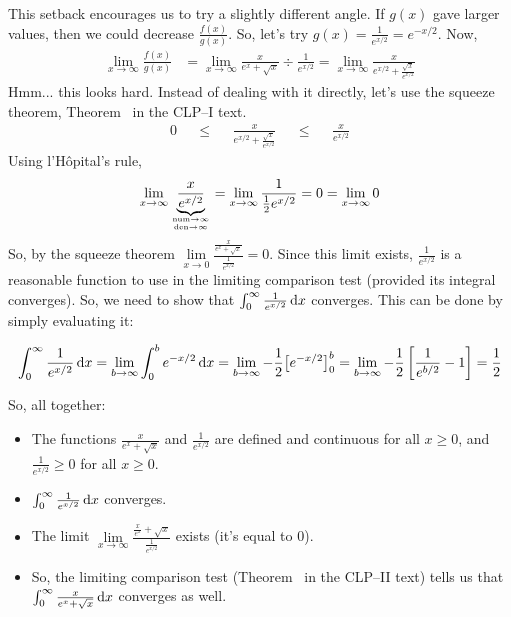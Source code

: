 \begin{solution}
\begin{description}
This setback encourages us to try a slightly different angle. If $g(x)$ gave larger values, then we could decrease $\frac{f(x)}{g(x)}$. So, let's try $g(x) = \frac{1}{e^{x/2}} = e^{-x/2}$. Now,
\begin{align*}
\lim_{x \to \infty}\frac{f(x)}{g(x)} &=
\lim_{x \to \infty}\frac{x}{e^x+\sqrt{x}}\div \frac{1}{e^{x/2}}=
\lim_{x \to \infty}\frac{x}{e^{x/2}+\frac{\sqrt{x}}{e^{x/2}}}
\end{align*}
Hmm... this looks hard. Instead of dealing with it directly, let's use the squeeze theorem, Theorem~ in the CLP--I text.
\begin{align*}
0 &&\leq&& \frac{x}{e^{x/2}+\frac{\sqrt{x}}{e^{x/2 }}}&&\leq&& \frac{x}{e^{x/2}}
\end{align*}
Using l'H\^{o}pital's rule,
\[\lim_{x \to \infty} \underbrace{\frac{x}{e^{x/2}}}_{\atp{\mathrm{num}\to \infty}{\mathrm{den}\to\infty}} = \lim_{x \to \infty}\frac{1}{\frac{1}{2}e^{x/2}}=0 = \lim_{x \to \infty}0\]
So, by the squeeze theorem $\lim\limits_{x \to 0}\frac{\frac{x}{e^x+\sqrt{x}}}{\frac{1}{e^{x/2}}}=0$. Since this limit exists, $\frac{1}{e^{x/2}}$ is a reasonable function to use in the limiting comparison test (provided its integral converges). So, we need to show that $\int_0^\infty \frac{1}{e^{x/2}}\,\mathrm{d}x$ converges. This can be done by simply evaluating it:

\[\int_0^\infty \frac{1}{e^{x/2}}\,\mathrm{d}x = \lim_{b \to \infty}\int_0^b {e^{-x/2}}\,\mathrm{d}x
= \lim_{b \to \infty} -\frac{1}{2}\big[e^{-x/2}\big]_0^b
= \lim_{b \to \infty} -\frac{1}{2}\left[\frac{1}{e^{b/2}}-1\right] = \frac{1}{2}\]

So, all together:

\begin{itemize}
\item The functions $\frac{x}{e^x+\sqrt{x}}$ and $\frac{1}{e^{x/2}}$ are defined and continuous for all $x \geq 0$, and $\frac{1}{e^{x/2}} \ge 0$ for all $x \ge 0$.
\item $\int_0^\infty \frac{1}{e^{x/2}}\,\mathrm{d}x$ converges.
\item The limit $\lim\limits_{x \to \infty}\frac{\frac{x}{e^x}+\sqrt{x}}{\frac{1}{e^{x/2}}}$ exists (it's equal to 0).
\item So, the limiting comparison test (Theorem~
in the CLP--II text) tells us that $\int_0^\infty \frac{x}{e^x+\sqrt{x}}\,\mathrm{d}x$ converges as well.
\end{itemize}
\end{description}

\end{solution}

